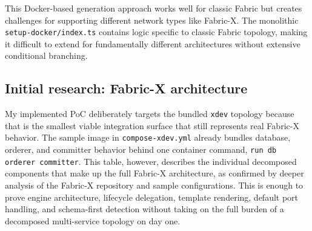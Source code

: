 This Docker-based generation approach works well for classic Fabric but creates challenges for supporting different network types like Fabric-X. The monolithic \texttt{setup-docker/index.ts} contains logic specific to classic Fabric topology, making it difficult to extend for fundamentally different architectures without extensive conditional branching.

\subsection{Initial research: Fabric-X architecture}

My implemented PoC deliberately targets the bundled \texttt{xdev} topology because that is the smallest viable integration surface that still represents real Fabric-X behavior. The sample image in \texttt{compose-xdev.yml} already bundles database, orderer, and committer behavior behind one container command, \texttt{run db orderer committer}. This table, however, describes the individual decomposed components that make up the full Fabric-X architecture, as confirmed by deeper analysis of the Fabric-X repository and sample configurations. This is enough to prove engine architecture, lifecycle delegation, template rendering, default port handling, and schema-first detection without taking on the full burden of a decomposed multi-service topology on day one.

